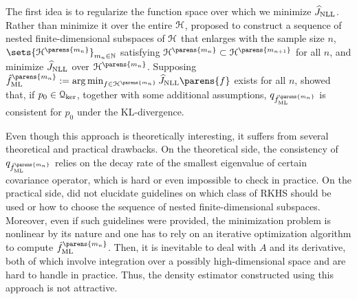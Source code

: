 The first idea is to regularize the function space over which we minimize $\widehat{J}_{\mathrm{NLL}}$. Rather than minimize it over the entire $\mathcal{H}$, \textcite{Fukumizu2005-mf} proposed to construct a sequence of nested finite-dimensional subspaces of $\mathcal{H}$ that enlarges with the sample size $n$, $\sets{\hil^{\parens{m_n}}}_{m_n \in \Natural}$ satisfying $\calH^{\parens{m_n}} \subset \hil^{\parens{m_{n+1}}}$ for all $n$, and minimize $\widehat{J}_{\mathrm{NLL}}$ over $\hil^{\parens{m_n}}$. Supposing $\hat{f}_{\ML}^{\parens{m_n}} := \argmin_{f \in \calH^{\parens{m_n}}} \widehat{J}_{\NLL} \parens{f}$ exists for all $n$, \textcite{Fukumizu2005-mf} showed that, if $p_0 \in \mathcal{Q}_{\ker}$, together with some additional assumptions, $q_{\hat{f}_{\ML}^{\parens{m_n}}}$ is consistent for $p_0$ under the KL-divergence. 

Even though this approach is theoretically interesting, it suffers from several theoretical and practical drawbacks. On the theoretical side, the consistency of $q_{\hat{f}_{\ML}^{\parens{m_n}}}$ relies on the decay rate of the smallest eigenvalue of certain covariance operator, which is hard or even impossible to check in practice. On the practical side, \textcites{Fukumizu2005-mf} did not elucidate guidelines on which class of RKHS should be used or how to choose the sequence of nested finite-dimensional subspaces. Moreover, even if such guidelines were provided, the minimization problem is nonlinear by its nature and one has to rely on an iterative optimization algorithm to compute $\hat{f}_{\ML}^{\parens{m_n}}$. Then, it is inevitable to deal with $A$ and its derivative, both of which involve integration over a possibly high-dimensional space and are hard to handle in practice. Thus, the density estimator constructed using this approach is not attractive. 


